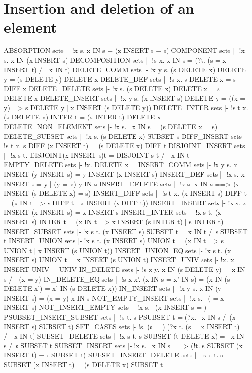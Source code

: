 \section{Insertion and deletion of an element}
\THEOREM ABSORPTION sets
|- !x s. x IN s = (x INSERT s = s)
\ENDTHEOREM
\THEOREM COMPONENT sets
|- !x s. x IN (x INSERT s)
\ENDTHEOREM
\THEOREM DECOMPOSITION sets
|- !s x. x IN s = (?t. (s = x INSERT t) /\ ~x IN t)
\ENDTHEOREM
\THEOREM DELETE\_COMM sets
|- !x y s. (s DELETE x) DELETE y = (s DELETE y) DELETE x
\ENDTHEOREM
\THEOREM DELETE\_DEF sets
|- !s x. s DELETE x = s DIFF {x}
\ENDTHEOREM
\THEOREM DELETE\_DELETE sets
|- !x s. (s DELETE x) DELETE x = s DELETE x
\ENDTHEOREM
\THEOREM DELETE\_INSERT sets
|- !x y s.
    (x INSERT s) DELETE y =
    ((x = y) => s DELETE y | x INSERT (s DELETE y))
\ENDTHEOREM
\THEOREM DELETE\_INTER sets
|- !s t x. (s DELETE x) INTER t = (s INTER t) DELETE x
\ENDTHEOREM
\THEOREM DELETE\_NON\_ELEMENT sets
|- !x s. ~x IN s = (s DELETE x = s)
\ENDTHEOREM
\THEOREM DELETE\_SUBSET sets
|- !x s. (s DELETE x) SUBSET s
\ENDTHEOREM
\THEOREM DIFF\_INSERT sets
|- !s t x. s DIFF (x INSERT t) = (s DELETE x) DIFF t
\ENDTHEOREM
\THEOREM DISJOINT\_INSERT sets
|- !x s t. DISJOINT(x INSERT s)t = DISJOINT s t /\ ~x IN t
\ENDTHEOREM
\THEOREM EMPTY\_DELETE sets
|- !x. {} DELETE x = {}
\ENDTHEOREM
\THEOREM INSERT\_COMM sets
|- !x y s. x INSERT (y INSERT s) = y INSERT (x INSERT s)
\ENDTHEOREM
\THEOREM INSERT\_DEF sets
|- !x s. x INSERT s = {y | (y = x) \/ y IN s}
\ENDTHEOREM
\THEOREM INSERT\_DELETE sets
|- !x s. x IN s ==> (x INSERT (s DELETE x) = s)
\ENDTHEOREM
\THEOREM INSERT\_DIFF sets
|- !s t x.
    (x INSERT s) DIFF t = (x IN t => s DIFF t | x INSERT (s DIFF t))
\ENDTHEOREM
\THEOREM INSERT\_INSERT sets
|- !x s. x INSERT (x INSERT s) = x INSERT s
\ENDTHEOREM
\THEOREM INSERT\_INTER sets
|- !x s t.
    (x INSERT s) INTER t = (x IN t => x INSERT (s INTER t) | s INTER t)
\ENDTHEOREM
\THEOREM INSERT\_SUBSET sets
|- !x s t. (x INSERT s) SUBSET t = x IN t /\ s SUBSET t
\ENDTHEOREM
\THEOREM INSERT\_UNION sets
|- !x s t.
    (x INSERT s) UNION t = (x IN t => s UNION t | x INSERT (s UNION t))
\ENDTHEOREM
\THEOREM INSERT\_UNION\_EQ sets
|- !x s t. (x INSERT s) UNION t = x INSERT (s UNION t)
\ENDTHEOREM
\THEOREM INSERT\_UNIV sets
|- !x. x INSERT UNIV = UNIV
\ENDTHEOREM
\THEOREM IN\_DELETE sets
|- !s x y. x IN (s DELETE y) = x IN s /\ ~(x = y)
\ENDTHEOREM
\THEOREM IN\_DELETE\_EQ sets
|- !s x x'.
    (x IN s = x' IN s) = (x IN (s DELETE x') = x' IN (s DELETE x))
\ENDTHEOREM
\THEOREM IN\_INSERT sets
|- !x y s. x IN (y INSERT s) = (x = y) \/ x IN s
\ENDTHEOREM
\THEOREM NOT\_EMPTY\_INSERT sets
|- !x s. ~({} = x INSERT s)
\ENDTHEOREM
\THEOREM NOT\_INSERT\_EMPTY sets
|- !x s. ~(x INSERT s = {})
\ENDTHEOREM
\THEOREM PSUBSET\_INSERT\_SUBSET sets
|- !s t. s PSUBSET t = (?x. ~x IN s /\ (x INSERT s) SUBSET t)
\ENDTHEOREM
\THEOREM SET\_CASES sets
|- !s. (s = {}) \/ (?x t. (s = x INSERT t) /\ ~x IN t)
\ENDTHEOREM
\THEOREM SUBSET\_DELETE sets
|- !x s t. s SUBSET (t DELETE x) = ~x IN s /\ s SUBSET t
\ENDTHEOREM
\THEOREM SUBSET\_INSERT sets
|- !x s. ~x IN s ==> (!t. s SUBSET (x INSERT t) = s SUBSET t)
\ENDTHEOREM
\THEOREM SUBSET\_INSERT\_DELETE sets
|- !x s t. s SUBSET (x INSERT t) = (s DELETE x) SUBSET t
\ENDTHEOREM
